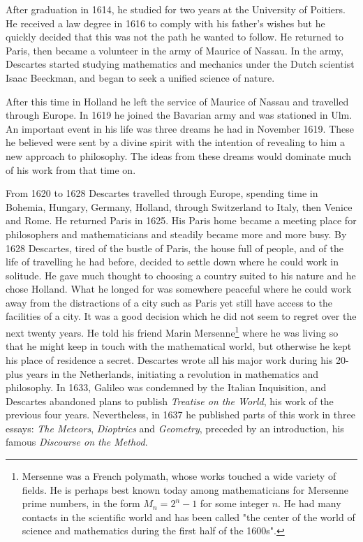 \documentclass[b5paper]{article}
\begin{document}
After graduation in 1614, he studied for two years at the University of Poitiers. He received a law degree in 1616 to comply with his father's wishes but he quickly decided that this was not the path he wanted to follow. He returned to Paris, then became a volunteer in the army of Maurice of Nassau. In the army, Descartes started studying mathematics and mechanics under the Dutch scientist Isaac Beeckman, and began to seek a unified science of nature.

After this time in Holland he left the service of Maurice of Nassau and travelled through Europe. In 1619 he joined the Bavarian army and was stationed in Ulm. An important event in his life was three dreams he had in November 1619. These he believed were sent by a divine spirit with the intention of revealing to him a new approach to philosophy. The ideas from these dreams would dominate much of his work from that time on.

From 1620 to 1628 Descartes travelled through Europe, spending time in Bohemia, Hungary, Germany, Holland, through Switzerland to Italy, then Venice and Rome. He returned Paris in 1625. His Paris home became a meeting place for philosophers and mathematicians and steadily became more and more busy. By 1628 Descartes, tired of the bustle of Paris, the house full of people, and of the life of travelling he had before, decided to settle down where he could work in solitude. He gave much thought to choosing a country suited to his nature and he chose Holland. What he longed for was somewhere peaceful where he could work away from the distractions of a city such as Paris yet still have access to the facilities of a city. It was a good decision which he did not seem to regret over the next twenty years. He told his friend Marin Mersenne\footnote{Mersenne was a French polymath, whose works touched a wide variety of fields. He is perhaps best known today among mathematicians for Mersenne prime numbers, in the form $M_n = 2^n − 1$ for some integer $n$. He had many contacts in the scientific world and has been called "the center of the world of science and mathematics during the first half of the 1600s".} where he was living so that he might keep in touch with the mathematical world, but otherwise he kept his place of residence a secret. Descartes wrote all his major work during his 20-plus years in the Netherlands, initiating a revolution in mathematics and philosophy. In 1633, Galileo was condemned by the Italian Inquisition, and Descartes abandoned plans to publish {\em Treatise on the World}, his work of the previous four years. Nevertheless, in 1637 he published parts of this work in three essays: {\em The Meteors}, {\em Dioptrics} and {\em Geometry}, preceded by an introduction, his famous {\em Discourse on the Method}.
\end{document}
